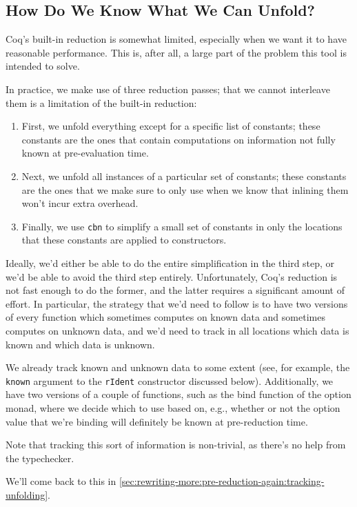 \subsection{How Do We Know What We Can Unfold?}\label{sec:rewriting-more:pre-reduction:tracking-unfolding}
Coq's built-in reduction is somewhat limited, especially when we want it to have reasonable performance.
This is, after all, a large part of the problem this tool is intended to solve.

In practice, we make use of three reduction passes; that we cannot interleave them is a limitation of the built-in reduction:
\begin{enumerate}
\item First, we unfold everything except for a specific list of constants; these constants are the ones that contain computations on information not fully known at pre-evaluation time.
\item Next, we unfold all instances of a particular set of constants; these constants are the ones that we make sure to only use when we know that inlining them won't incur extra overhead.
\item Finally, we use \texttt{cbn} to simplify a small set of constants in only the locations that these constants are applied to constructors.
\end{enumerate}

Ideally, we'd either be able to do the entire simplification in the third step, or we'd be able to avoid the third step entirely.
Unfortunately, Coq's reduction is not fast enough to do the former, and the latter requires a significant amount of effort.
In particular, the strategy that we'd need to follow is to have two versions of every function which sometimes computes on known data and sometimes computes on unknown data, and we'd need to track in all locations which data is known and which data is unknown.

We already track known and unknown data to some extent (see, for example, the \texttt{known} argument to the \texttt{rIdent} constructor discussed below).
Additionally, we have two versions of a couple of functions, such as the bind function of the option monad, where we decide which to use based on, e.g., whether or not the option value that we're binding will definitely be known at pre-reduction time.

Note that tracking this sort of information is non-trivial, as there's no help from the typechecker.

We'll come back to this in \autoref{sec:rewriting-more:pre-reduction-again:tracking-unfolding}.

